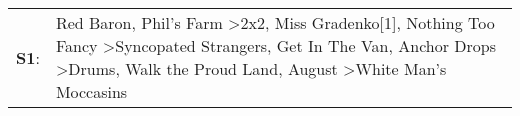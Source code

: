 \begin{supertabular}{p{0.03\textwidth}p{0.92\textwidth}}
 \textbf{S1}:  &  Red Baron\textsuperscript{}, \enspace Phil's Farm\textsuperscript{} \textgreater \enspace 2x2\textsuperscript{}, \enspace Miss Gradenko[1]\textsuperscript{}, \enspace Nothing Too Fancy\textsuperscript{} \textgreater \enspace Syncopated Strangers\textsuperscript{}, \enspace Get In The Van\textsuperscript{}, \enspace Anchor Drops\textsuperscript{} \textgreater \enspace Drums\textsuperscript{}, \enspace Walk the Proud Land\textsuperscript{}, \enspace August\textsuperscript{} \textgreater \enspace White Man's Moccasins\textsuperscript{}  \enspace  \\
\end{supertabular}
